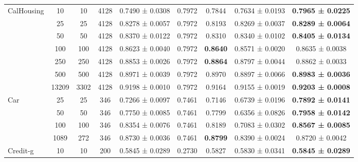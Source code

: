 \begin{table}
{\begin{tabular}[H]{@{}lcccccccc@{}}
\multirow{7}{*}{CalHousing}   & 10    & 10   & 4128 & 0.7490 ± 0.0308      & 0.7972               & 0.7844          & 0.7634 ± 0.0193          & \textbf{0.7965 ± 0.0225} \\
                              & 25    & 25   & 4128 & 0.8278 ± 0.0057      & 0.7972               & 0.8193          & 0.8269 ± 0.0037          & \textbf{0.8289 ± 0.0064} \\
                              & 50    & 50   & 4128 & 0.8370 ± 0.0122      & 0.7972               & 0.8310          & 0.8340 ± 0.0102          & \textbf{0.8405 ± 0.0134} \\
                              & 100   & 100  & 4128 & 0.8623 ± 0.0040      & 0.7972               & \textbf{0.8640} & 0.8571 ± 0.0020          & 0.8635 ± 0.0038          \\
                              & 250   & 250  & 4128 & 0.8853 ± 0.0026      & 0.7972               & \textbf{0.8864} & 0.8797 ± 0.0044          & 0.8862 ± 0.0033          \\
                              & 500   & 500  & 4128 & 0.8971 ± 0.0039      & 0.7972               & 0.8970          & 0.8897 ± 0.0066          & \textbf{0.8983 ± 0.0036} \\
                              & 13209 & 3302 & 4128 & 0.9198 ± 0.0010      & 0.7972               & 0.9164          & 0.9155 ± 0.0019          & \textbf{0.9203 ± 0.0008} \\
                              \midrule
\multirow{4}{*}{Car}          & 25    & 25   & 346  & 0.7266 ± 0.0097      & 0.7461               & 0.7146          & 0.6739 ± 0.0196          & \textbf{0.7892 ± 0.0141} \\
                              & 50    & 50   & 346  & 0.7750 ± 0.0085      & 0.7461               & 0.7799          & 0.6356 ± 0.0826          & \textbf{0.7958 ± 0.0142} \\
                              & 100   & 100  & 346  & 0.8354 ± 0.0076      & 0.7461               & 0.8189          & 0.7083 ± 0.0302          & \textbf{0.8567 ± 0.0085} \\
                              & 1089  & 272  & 346  & 0.8730 ± 0.0036      & 0.7461               & \textbf{0.8799} & 0.8390 ± 0.0024          & 0.8720 ± 0.0042          \\
                              \midrule
\multirow{6}{*}{Credit-g}     & 10    & 10   & 200  & 0.5845 ± 0.0289      & 0.2730               & 0.5827          & 0.5830 ± 0.0341          & \textbf{0.5845 ± 0.0289} \\

\end{tabular}}
\end{table}
